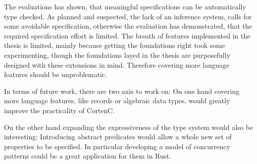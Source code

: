 \documentclass{book}
\theoremstyle{definition}
\begin{document}
The evaluations has shown, that meaningful specifications can be automatically type checked. 
As planned and suspected, the lack of an inference system, calls for some avoidable specification, otherwise the evaluation has demonstrated, that the required specification effort is limited.
The breath of features implemented in the thesis is limited, mainly because getting the foundations right took some experimenting, though the foundations layed in the thesis are purposefully designed with these extensions in mind. Therefore covering more language features should be unproblematic.


In terms of future work, there are two axis to work on: 
On one hand covering more language features, like records or algebraic data types, would greatly improve the practicality of CortenC. 

On the other hand expanding the expressiveness of the type system would also be interesting: Introducing abstract predicates would allow a whole new set of properties to be specified. In particular developing a model of concurrency patterns could be a great application for them in Rust.


\printbibliography
\end{document}
